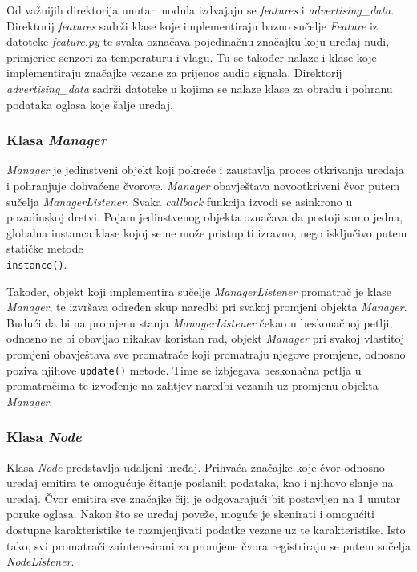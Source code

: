 Od važnijih direktorija unutar modula izdvajaju se \textit{features} i \textit{advertising\_data}. Direktorij \textit{features} sadrži klase koje implementiraju bazno sučelje \textit{Feature} iz datoteke \textit{feature.py} te svaka označava pojedinačnu značajku koju uređaj nudi, primjerice senzori za temperaturu i vlagu. Tu se također nalaze i klase koje implementiraju značajke vezane za prijenos audio signala. Direktorij \textit{advertising\_data} sadrži datoteke u kojima se nalaze klase za obradu i pohranu podataka oglasa koje šalje uređaj. 


\subsubsection{Klasa \textit{Manager}}
\textit{Manager} je jedinstveni objekt koji pokreće i zaustavlja proces otkrivanja uređaja i pohranjuje dohvaćene čvorove. \textit{Manager} obavještava novootkriveni čvor putem sučelja \textit{ManagerListener}. Svaka \textit{callback} funkcija izvodi se asinkrono u pozadinskoj dretvi. Pojam jedinstvenog objekta označava da postoji samo jedna, globalna instanca klase kojoj se ne može pristupiti izravno, nego isključivo putem statičke metode \\\lstinline|instance()|.

Također, objekt koji implementira sučelje \textit{ManagerListener} promatrač je klase \textit{Manager}, te izvršava određen skup naredbi pri svakoj promjeni objekta \textit{Manager}. Budući da bi na promjenu stanja \textit{ManagerListener} čekao u beskonačnoj petlji, odnosno ne bi obavljao nikakav koristan rad, objekt \textit{Manager} pri svakoj vlastitoj promjeni obavještava sve promatrače koji promatraju njegove promjene, odnosno poziva njihove \lstinline|update()| metode. Time se izbjegava beskonačna petlja u promatračima te izvođenje na zahtjev naredbi vezanih uz promjenu objekta \textit{Manager}.


\subsubsection{Klasa \textit{Node}}
Klasa \textit{Node} predstavlja udaljeni uređaj. Prihvaća značajke koje čvor odnosno uređaj emitira te omogućuje čitanje poslanih podataka, kao i njihovo slanje na uređaj. Čvor emitira sve značajke čiji je odgovarajući bit postavljen na 1 unutar poruke oglasa. Nakon što se uređaj poveže, moguće je skenirati i omogućiti dostupne karakteristike te razmjenjivati podatke vezane uz te karakteristike. Isto tako, svi promatrači zainteresirani za promjene čvora registriraju se putem sučelja \textit{NodeListener}.

